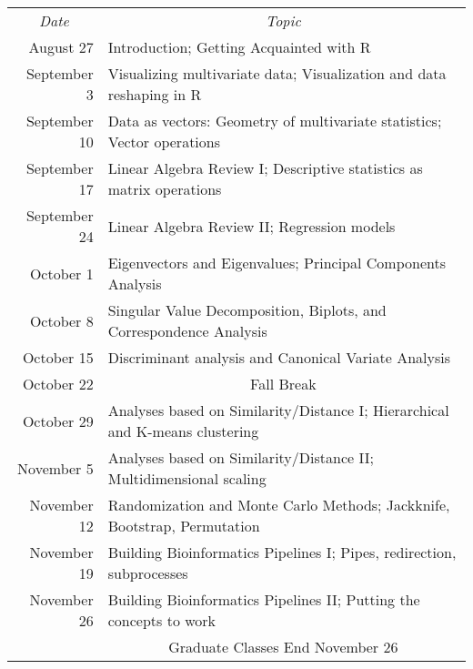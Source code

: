 \documentclass[11pt,letterpaper]{article}
\begin{document}
\renewcommand{\arraystretch}{1.4}
\begin{center}
\begin{tabular}{rp{5.5in}}
\multicolumn{1}{c}{{\sl Date}} & \multicolumn{1}{c}{{\sl Topic}} \\

August 27 & Introduction; Getting Acquainted with R \\
September 3 & Visualizing multivariate data; Visualization and data reshaping in R\\
September 10 & Data as vectors: Geometry of multivariate statistics; Vector operations \\
September 17 & Linear Algebra Review I; Descriptive statistics as matrix operations\\
September 24 & Linear Algebra Review II; Regression models \\
October 1 & Eigenvectors and Eigenvalues; Principal Components Analysis \\
October 8 & Singular Value Decomposition, Biplots, and Correspondence Analysis\\
October 15 & Discriminant analysis and Canonical Variate Analysis\\
October 22 & \multicolumn{1}{c}{{\sc Fall Break}} \\
October 29 & Analyses based on Similarity/Distance I; Hierarchical and K-means clustering\\
November 5 & Analyses based on Similarity/Distance II; Multidimensional scaling\\
November 12 & Randomization and Monte Carlo Methods; Jackknife, Bootstrap, Permutation\\
November 19 & Building Bioinformatics Pipelines I; Pipes, redirection, subprocesses \\
November 26 & Building Bioinformatics Pipelines II; Putting the concepts to work \\

& \multicolumn{1}{c}{{\sc Graduate Classes End November 26}} \\
\end{tabular}
\end{center}
\end{document}
